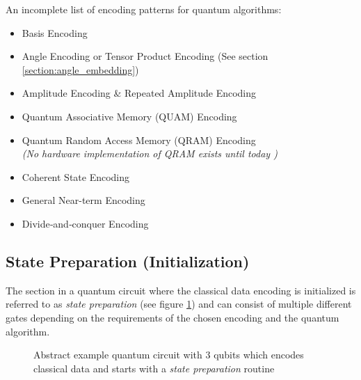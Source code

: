\noindent An incomplete list of encoding patterns for quantum algorithms\cite{schuld2021supervised,Weigold2021_ExpandingDataEncodingPatterns,leymann2019pattern}: \label{list:encoding_patterns}
\begin{itemize}
    \item Basis Encoding
    \item Angle Encoding or Tensor Product Encoding (See section \ref{section:angle_embedding}) \cite{leymannBitterTruthGatebased2020}
    \item Amplitude Encoding \& Repeated Amplitude Encoding
    \item Quantum Associative Memory (QUAM) Encoding
    \item Quantum Random Access Memory (QRAM) Encoding \\\textit{(No hardware implementation of QRAM exists until today \cite{Weigold2021_ExpandingDataEncodingPatterns})}
    \item Coherent State Encoding
    \item General Near-term Encoding
    \item Divide‑and‑conquer Encoding \cite{araujoDivideandconquerAlgorithmQuantum2021}
\end{itemize}

\subsection{State Preparation (Initialization)}\label{subsection:state_preparation}

The section in a quantum circuit where the classical data encoding is initialized is referred to as \textit{state preparation}\cite{leymann2019pattern,Weigold2021_ExpandingDataEncodingPatterns} (see figure \ref{fig:circuit_state_preparation}) and can consist of multiple different gates depending on the requirements of the chosen encoding and the quantum algorithm. 

\begin{figure}[!h]
    \centering
    \caption{Abstract example quantum circuit with 3 qubits which encodes classical data and starts with a \textit{state preparation} routine}
    \label{fig:circuit_state_preparation}
\end{figure}

